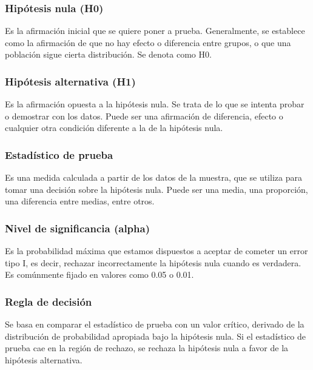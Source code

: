 \documentclass[
  11pt,
  bookmarksnumbered]{article}
\begin{document}
\hypertarget{hipuxf3tesis-nula-h0}{%
\subsubsection{Hipótesis nula (H0)}\label{hipuxf3tesis-nula-h0}}

Es la afirmación inicial que se quiere poner a prueba.
Generalmente, se establece como la afirmación de que no hay efecto o diferencia entre grupos, o que una población sigue cierta distribución.
Se denota como H0.

\hypertarget{hipuxf3tesis-alternativa-h1}{%
\subsubsection{Hipótesis alternativa (H1)}\label{hipuxf3tesis-alternativa-h1}}

Es la afirmación opuesta a la hipótesis nula.
Se trata de lo que se intenta probar o demostrar con los datos.
Puede ser una afirmación de diferencia, efecto o cualquier otra condición diferente a la de la hipótesis nula.

\hypertarget{estaduxedstico-de-prueba}{%
\subsubsection{Estadístico de prueba}\label{estaduxedstico-de-prueba}}

Es una medida calculada a partir de los datos de la muestra, que se utiliza para tomar una decisión sobre la hipótesis nula.
Puede ser una media, una proporción, una diferencia entre medias, entre otros.

\hypertarget{nivel-de-significancia-alpha}{%
\subsubsection{Nivel de significancia (alpha)}\label{nivel-de-significancia-alpha}}

Es la probabilidad máxima que estamos dispuestos a aceptar de cometer un error tipo I, es decir, rechazar incorrectamente la hipótesis nula cuando es verdadera.
Es comúnmente fijado en valores como 0.05 o 0.01.

\hypertarget{regla-de-decisiuxf3n}{%
\subsubsection{Regla de decisión}\label{regla-de-decisiuxf3n}}

Se basa en comparar el estadístico de prueba con un valor crítico, derivado de la distribución de probabilidad apropiada bajo la hipótesis nula.
Si el estadístico de prueba cae en la región de rechazo, se rechaza la hipótesis nula a favor de la hipótesis alternativa.
\end{document}
